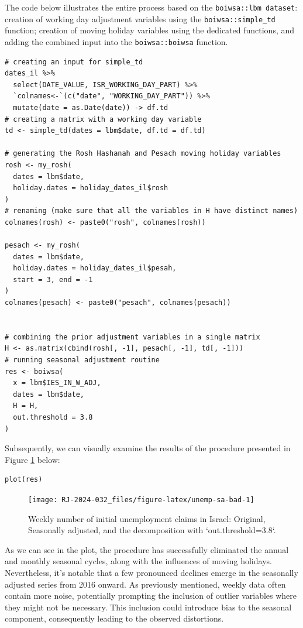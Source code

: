 The code below illustrates the entire process based on the \texttt{boiwsa::lbm\ dataset}: creation of working day adjustment variables using the \texttt{boiwsa::simple\_td} function; creation of moving holiday variables using the dedicated functions, and adding the combined input into the \texttt{boiwsa::boiwsa} function.

\begin{verbatim}
# creating an input for simple_td 
dates_il %>%
  select(DATE_VALUE, ISR_WORKING_DAY_PART) %>%
  `colnames<-`(c("date", "WORKING_DAY_PART")) %>%
  mutate(date = as.Date(date)) -> df.td
# creating a matrix with a working day variable
td <- simple_td(dates = lbm$date, df.td = df.td)

# generating the Rosh Hashanah and Pesach moving holiday variables
rosh <- my_rosh(
  dates = lbm$date,
  holiday.dates = holiday_dates_il$rosh
)
# renaming (make sure that all the variables in H have distinct names)
colnames(rosh) <- paste0("rosh", colnames(rosh))

pesach <- my_rosh(
  dates = lbm$date,
  holiday.dates = holiday_dates_il$pesah,
  start = 3, end = -1
)
colnames(pesach) <- paste0("pesach", colnames(pesach))


# combining the prior adjustment variables in a single matrix
H <- as.matrix(cbind(rosh[, -1], pesach[, -1], td[, -1]))
# running seasonal adjustment routine
res <- boiwsa(
  x = lbm$IES_IN_W_ADJ,
  dates = lbm$date,
  H = H,
  out.threshold = 3.8
)
\end{verbatim}

Subsequently, we can visually examine the results of the procedure presented in Figure \ref{fig:unemp-sa-bad} below:

\begin{verbatim}
plot(res)
\end{verbatim}

\begin{figure}[H]

{\centering \texttt{[image: RJ-2024-032\_files/figure-latex/unemp-sa-bad-1]} 

}

\caption{Weekly number of initial unemployment claims in Israel: Original, Seasonally adjusted, and the decomposition with `out.threshold=3.8`.}\label{fig:unemp-sa-bad}
\end{figure}

As we can see in the plot, the procedure has successfully eliminated the annual and monthly seasonal cycles, along with the influences of moving holidays. Nevertheless, it's notable that a few pronounced declines emerge in the seasonally adjusted series from 2016 onward. As previously mentioned, weekly data often contain more noise, potentially prompting the inclusion of outlier variables where they might not be necessary. This inclusion could introduce bias to the seasonal component, consequently leading to the observed distortions.

